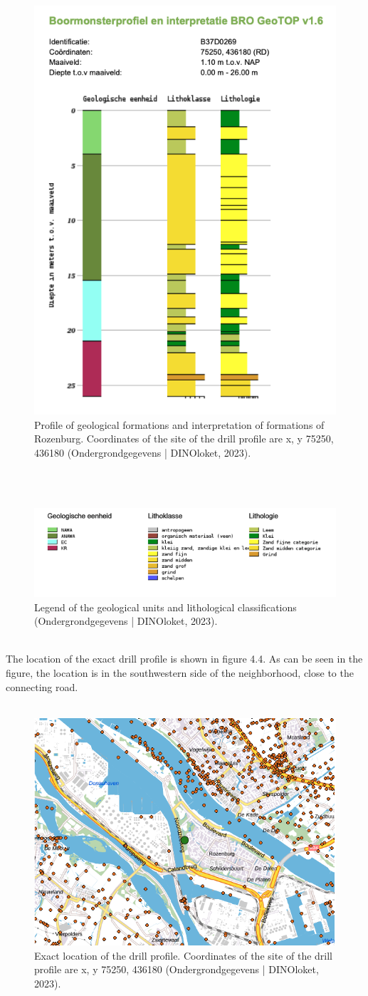 \begin{figure}[htbp]
    \centering
    \includegraphics[width=0.40\linewidth]{figures/roz/boor.png}
    \caption{Profile of geological formations and interpretation of formations of Rozenburg. Coordinates of the site of the drill profile are x, y 75250, 436180 (Ondergrondgegevens | DINOloket, 2023).}
\end{figure}\\
\\
\begin{figure}[htbp]
    \centering
    \includegraphics[width=0.40\linewidth]{figures/roz/litho.png}
    \caption{Legend of the geological units and lithological classifications (Ondergrondgegevens | DINOloket, 2023).}
\end{figure}\\
\newpage
The location of the exact drill profile is shown in figure 4.4. As can be seen in the figure, the location is in the southwestern side of the neighborhood, close to the connecting road. \\
\\
\begin{figure}[htbp]
    \centering
    \includegraphics[width=0.40\linewidth]{figures/roz/drillsite.png}
    \caption{Exact location of the drill profile. Coordinates of the site of the drill profile are x, y 75250, 436180 (Ondergrondgegevens | DINOloket, 2023).}
\end{figure}\\
